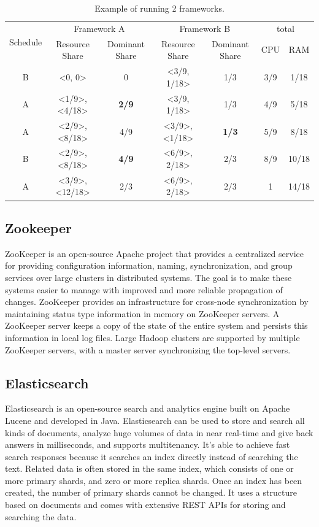 \documentclass[12pt,oneside,openright,a4paper]{cpe-english-project}
\begin{document}
\begin{table}[!h]
  \caption{Example of running 2 frameworks.}\label{tbl:DRFTwoFramework}
  \begin{tabular}{|c|c|c|c|c|c|c|}
    \hline
    \multirow{2}{*}{Schedule} & \multicolumn{2}{c|}{Framework A}& \multicolumn{2}{c|}{Framework B}& \multicolumn{2}{c|}{total}\\ 
    \cline{2-7} & Resource Share & Dominant Share & Resource Share & Dominant Share & CPU & RAM \\ 
    \hline
    B  & <0, 0> & 0 & <3/9, 1/18> & 1/3 & 3/9 & 1/18 \\ 
    \hline
    A  & <1/9>, <4/18> & \textbf{2/9} & <3/9, 1/18> & 1/3 & 4/9 & 5/18 \\ 
    \hline
    A  & <2/9>, <8/18> & 4/9 & <3/9>, <1/18> & \textbf{1/3} & 5/9 & 8/18 \\ 
    \hline
    B  & <2/9>, <8/18> & \textbf{4/9} & <6/9>, 2/18> & 2/3 & 8/9 & 10/18 \\ 
    \hline
    A  & <3/9>, <12/18> & 2/3 & <6/9>, 2/18> & 2/3 & 1 & 14/18 \\ 
    \hline
  \end{tabular}
\end{table}

\subsection{Zookeeper}

\hspace{10mm}ZooKeeper is an open-source Apache project that provides a centralized service for providing configuration information, naming, synchronization, and group services over large clusters in distributed systems. The goal is to make these systems easier to manage with improved and more reliable propagation of changes. ZooKeeper provides an infrastructure for cross-node synchronization by maintaining status type information in memory on ZooKeeper servers. A ZooKeeper server keeps a copy of the state of the entire system and persists this information in local log files. Large Hadoop clusters are supported by multiple ZooKeeper servers, with a master server synchronizing the top-level servers. \cite{zookeeper}

\subsection{Elasticsearch}

\hspace{10mm}Elasticsearch is an open-source search and analytics engine built on Apache Lucene and developed in Java. Elasticsearch can be used to store and search all kinds of documents, analyze huge volumes of data in near real-time and give back answers in milliseconds, and supports multitenancy. It’s able to achieve fast search responses because it searches an index directly instead of searching the text. Related data is often stored in the same index, which consists of one or more primary shards, and zero or more replica shards. Once an index has been created, the number of primary shards cannot be changed. It uses a structure based on documents and comes with extensive REST APIs for storing and searching the data. 
\end{document}
